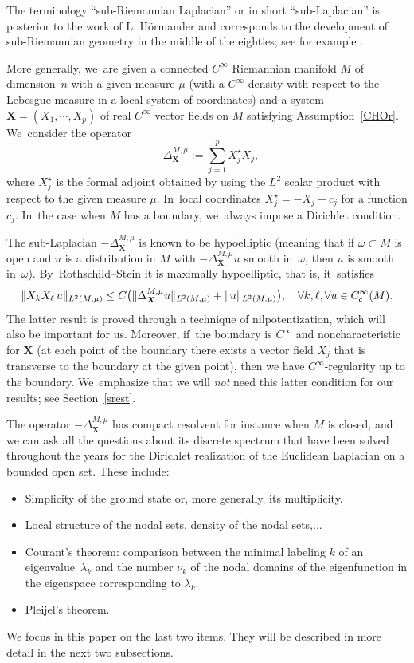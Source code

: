 \documentclass[10pt]{amsart}
\newcommand{\rc}{\textup{c}}
\newcommand{\bX}{{\boldsymbol{X}}}
\theoremstyle{definition}
\newcommand{\1}{\mathbbm{1}}
\begin{document}
The terminology ``sub-Riemannian Laplacian'' or in short ``sub-Laplacian'' is posterior to the work of L. Hörmander and corresponds to the development of sub-Riemannian geometry in the middle of the eighties; see for example \cite{AgBaBo,BeRi,Je,Str2}.

More generally, we~are given a connected $C^\infty$ Riemannian manifold $M$ of dimension~$n$ with a given measure $\mu$ (with a $C^\infty$-density with respect to the Lebesgue measure in a local system of coordinates) and a system $\bX= (X_1,\cdots,X_p)$ of real $C^\infty$ vector fields on $M$ satisfying Assumption~\ref{CHOr}. We~consider the operator
\[
-\Delta_\bX^{M,\mu} :=\sum_{j=1}^p X_j^\star X_j,
\]
where $X_j^\star$ is the formal adjoint obtained by using the $L^2$ scalar product with respect to the given measure $\mu$. In~local coordinates $X_j^\star =- X_j +c_j$ for a function $c_j$. In~the case when $M$ has a boundary, we~always impose a Dirichlet condition.

The sub-Laplacian $-\Delta_\bX^{M,\mu}$ is known to be hypoelliptic \cite{Ho} (meaning that if $\omega\subset M$ is open and $u$ is a distribution in $M$ with $-\Delta_\bX^{M,\mu} u$ smooth in~$\omega$, then $u$ is smooth in~$\omega$). By~Rothschild--Stein \cite{RS} it is maximally hypoelliptic, that is, it~satisfies
\[
\| X_k X_\ell \,u \|_{L^2(M,\mu)} \leq C \bigl(\|\Delta_\bX^{M,\mu} u \|_{L^2(M,\mu)} + \|u\|_{L^2(M,\mu)} \bigr), \quad \forall k,\ell, \forall u \in C_\rc^\infty(M).
\]
The latter result is proved through a technique of nilpotentization, which will also be important for us. Moreover, if~the boundary is $C^\infty$ and noncharacteristic for $\bX$ (\ie at each point of the boundary there exists a vector field $ X_j$ that is transverse to the boundary at the given point), then we have $C^\infty$-regularity up to the boundary. We~emphasize that we will \emph{not} need this latter condition for our results; see Section~\ref{srest}.

The operator $-\Delta_\bX^{M,\mu}$ has compact resolvent for instance when $M$ is closed, and we can ask all the questions about its discrete spectrum that have been solved throughout the years for the Dirichlet realization of the Euclidean Laplacian on a bounded open set. These include:
\begin{itemize}
\item Simplicity of the ground state or, more generally, its multiplicity.
\item Local structure of the nodal sets, density of the nodal sets,...
\item Courant's theorem: comparison between the minimal labeling $ k$ of an eigenvalue~$\lambda_k$ and the number $\nu_k$ of the nodal domains of the eigenfunction in the eigenspace corresponding to $\lambda_k$.
\item Pleijel's theorem.
\end{itemize}
We focus in this paper on the last two items. They will be described in more detail in the next two subsections.
\end{document}
